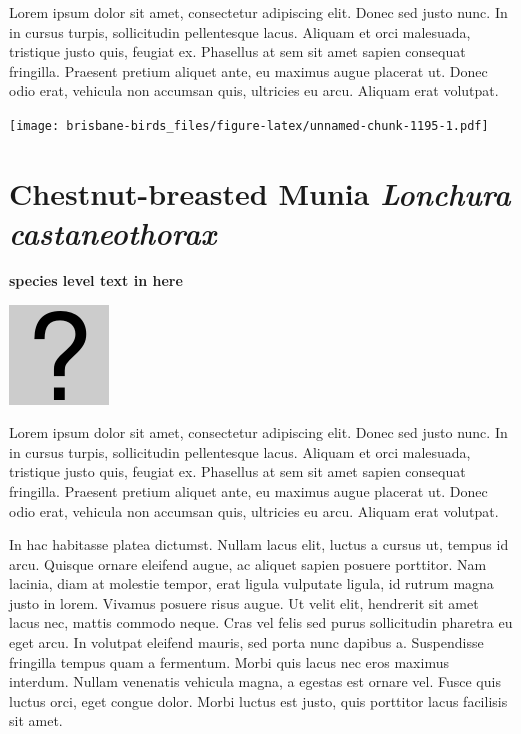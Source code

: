 \documentclass[]{book}
\let\origfigure\figure
\let\endorigfigure\endfigure
\renewenvironment{figure}[1][2] {
  \expandafter\origfigure\expandafter[H]
} {
  \endorigfigure
}
\begin{document}
Lorem ipsum dolor sit amet, consectetur adipiscing elit. Donec sed justo
nunc. In in cursus turpis, sollicitudin pellentesque lacus. Aliquam et
orci malesuada, tristique justo quis, feugiat ex. Phasellus at sem sit
amet sapien consequat fringilla. Praesent pretium aliquet ante, eu
maximus augue placerat ut. Donec odio erat, vehicula non accumsan quis,
ultricies eu arcu. Aliquam erat volutpat.

\texttt{[image: brisbane-birds\_files/figure-latex/unnamed-chunk-1195-1.pdf]}

\section{\texorpdfstring{Chestnut-breasted Munia \emph{Lonchura
castaneothorax}}{Chestnut-breasted Munia Lonchura castaneothorax}}\label{chestnut-breasted-munia-lonchura-castaneothorax}

\textbf{species level text in here}

\begin{figure}
\centering
\includegraphics{assets/missing.png}
\caption{No image for species}
\end{figure}

Lorem ipsum dolor sit amet, consectetur adipiscing elit. Donec sed justo
nunc. In in cursus turpis, sollicitudin pellentesque lacus. Aliquam et
orci malesuada, tristique justo quis, feugiat ex. Phasellus at sem sit
amet sapien consequat fringilla. Praesent pretium aliquet ante, eu
maximus augue placerat ut. Donec odio erat, vehicula non accumsan quis,
ultricies eu arcu. Aliquam erat volutpat.

In hac habitasse platea dictumst. Nullam lacus elit, luctus a cursus ut,
tempus id arcu. Quisque ornare eleifend augue, ac aliquet sapien posuere
porttitor. Nam lacinia, diam at molestie tempor, erat ligula vulputate
ligula, id rutrum magna justo in lorem. Vivamus posuere risus augue. Ut
velit elit, hendrerit sit amet lacus nec, mattis commodo neque. Cras vel
felis sed purus sollicitudin pharetra eu eget arcu. In volutpat eleifend
mauris, sed porta nunc dapibus a. Suspendisse fringilla tempus quam a
fermentum. Morbi quis lacus nec eros maximus interdum. Nullam venenatis
vehicula magna, a egestas est ornare vel. Fusce quis luctus orci, eget
congue dolor. Morbi luctus est justo, quis porttitor lacus facilisis sit
amet.
\end{document}
